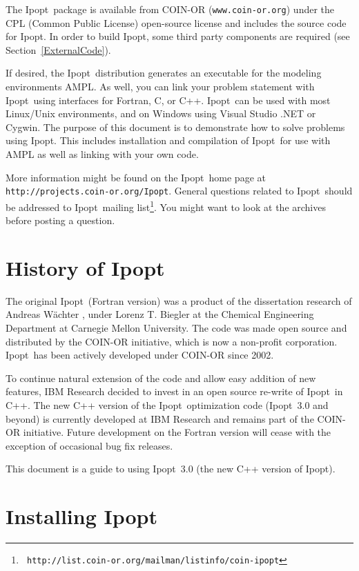 \documentclass[letter,10pt]{article}
\newcommand{\Ipopt}{{\sc Ipopt}}
\begin{document}
The \Ipopt\ package is available from COIN-OR
(\texttt{www.coin-or.org}) under the CPL (Common Public
License) open-source license and includes the source code for \Ipopt.
In order to build \Ipopt, some third party components are required
(see Section~\ref{ExternalCode}).

If desired, the \Ipopt\ distribution generates an executable for the
modeling environments AMPL. As well, you can link your problem
statement with \Ipopt\ using interfaces for Fortran, C, or C++.
\Ipopt\ can be used with most Linux/Unix environments, and on Windows
using Visual Studio .NET or Cygwin.  The purpose of this document is
to demonstrate how to solve problems using \Ipopt. This includes
installation and compilation of \Ipopt\ for use with AMPL as well as
linking with your own code.

More information might be found on the \Ipopt\ home page at
\texttt{http://projects.coin-or.org/Ipopt}.  General questions related
to \Ipopt\ should be addressed to \Ipopt\ mailing list\footnote{\tt
  http://list.coin-or.org/mailman/listinfo/coin-ipopt}. You might
want to look at the archives before posting a question.

\section{History of \Ipopt}
The original \Ipopt\ (Fortran version) was a product of the dissertation
research of Andreas W\"achter \cite{WaechterPhD}, under Lorenz
T. Biegler at the Chemical Engineering Department at Carnegie Mellon
University. The code was made open source and distributed by the
COIN-OR initiative, which is now a non-profit corporation.  \Ipopt\ has
been actively developed under COIN-OR since 2002.

To continue natural extension of the code and allow easy addition of
new features, IBM Research decided to invest in an open source
re-write of \Ipopt\ in C++.  The new C++ version of the \Ipopt\
optimization code (\Ipopt\ 3.0 and beyond) is currently developed at IBM
Research and remains part of the COIN-OR initiative. Future
development on the Fortran version will cease with the exception of
occasional bug fix releases.

This document is a guide to using \Ipopt\ 3.0 (the new C++ version of \Ipopt).

\section{Installing \Ipopt}\label{Installing}
\end{document}
